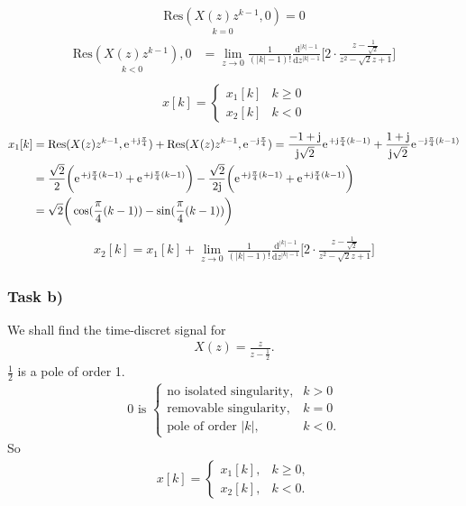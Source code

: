 \begin{align}
	\underset{k=0}{\mathrm{Res}(X(z)z^{k-1},0)}=0
\end{align}
\begin{align}
	\underset{k<0}{\mathrm{Res}(X(z)z^{k-1}),0}&=\lim\limits_{z\rightarrow0}\frac{1}{(|k|-1)!}\frac{\mathrm{d}^{|k|-1}}{\mathrm{d}z^{|k|-1}}\bigg [2\cdot\frac{z-\frac{1}{\sqrt{2}}}{z^2-\sqrt{2}z+1}\bigg]\nonumber\\
\end{align}
\begin{align}
	x[k]=\begin{cases}
		x_1[k] &k\geq0 \\
		x_2[k] &k<0
	\end{cases}
\end{align}
\begin{align}
	x_1[k]&=\mathrm{Res}(X(z)z^{k-1},\e^{+\im\frac{\pi}{4}})+\mathrm{Res}(X(z)z^{k-1},\e^{-\im\frac{\pi}{4}})=\frac{-1+\im}{\im\sqrt{2}}\e^{+\im\frac{\pi}{4}(k-1)}+\frac{1+\im}{\im\sqrt{2}}\e^{-\im\frac{\pi}{4}(k-1)}\nonumber\\
	&=\frac{\sqrt{2}}{2}\bigg (\e^{+\im\frac{\pi}{4}(k-1)}+\e^{+\im\frac{\pi}{4}(k-1)}\bigg )-\frac{\sqrt{2}}{2\im} \bigg (\e^{+\im\frac{\pi}{4}(k-1)}+\e^{+\im\frac{\pi}{4}(k-1)}\bigg)\nonumber\\
	&=\sqrt{2}\bigg(\cos(\frac{\pi}{4}(k-1))-\sin(\frac{\pi}{4}(k-1))\bigg)
\end{align}
\begin{align}
	x_2[k]=x_1[k]+\lim\limits_{z\rightarrow0}\frac{1}{(|k|-1)!}\frac{\mathrm{d}^{|k|-1}}{\mathrm{d}z^{|k|-1}}\bigg [2\cdot\frac{z-\frac{1}{\sqrt{2}}}{z^2-\sqrt{2}z+1}\bigg]
\end{align}
\subsubsection{Task b)}
We shall find the time-discret signal for
\begin{align}
	X(z)=\frac{z}{z-\frac{1}{2}}.
\end{align}
$\frac{1}{2}$ is a pole of order 1. \\
\begin{align}
	0\text{ is }
	\begin{cases}
		\text{no isolated singularity}, &k > 0 \\
		\text{removable singularity}, &k=0 \\
		\text{pole of order }|k|, &k < 0.
	\end{cases}
\end{align}
So
\begin{align}
	x[k]=
	\begin{cases}
		x_1[k], &k\geq0, \\
		x_2[k],	&k<0.
	\end{cases}
\end{align}

